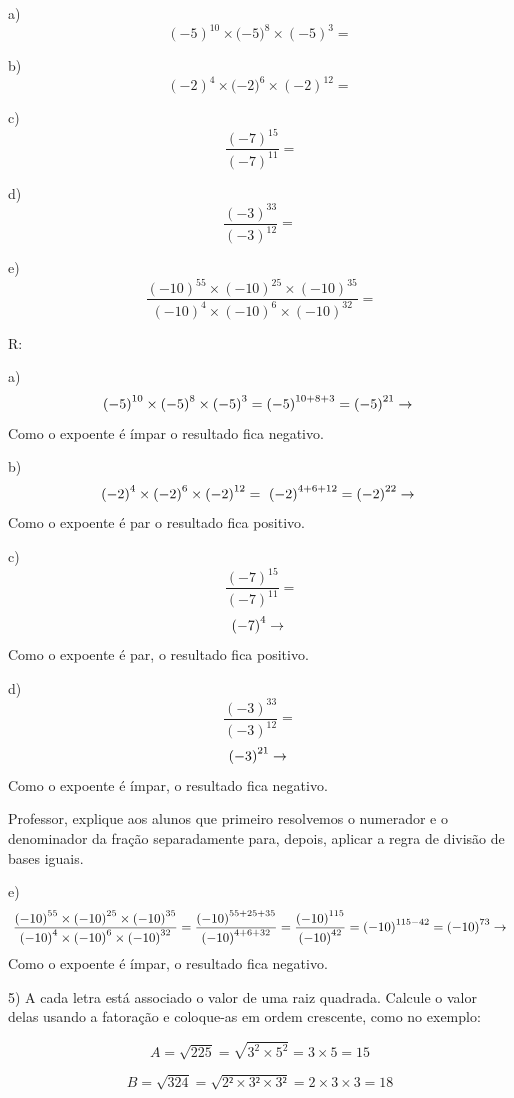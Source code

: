 a) \[{( - 5)}^{10} \times ( - {5)}^{8} \times {( - 5)}^{3} =\]

b) \[{( - 2)}^{4} \times ( - {2)}^{6} \times {( - 2)}^{12} =\]

c) \[\ \frac{{( - 7)}^{15}}{{( - 7)}^{11}} =\]

d) \[\frac{{( - 3)}^{33}}{{( - 3)}^{12}} =\]

e)\[\ \frac{{( - 10)}^{55} \times {( - 10)}^{25} \times {( - 10)}^{35}}{{( - 10)}^{4} \times {( - 10)}^{6} \times {( - 10)}^{32}} =\]

R:

a)
\[{( - 5)}^{10} \times ( - {5)}^{8} \times \left( - 5 \right)^{3} = \left( - 5 \right)^{10 + 8 + 3} = \left( - 5 \right)^{21} \rightarrow\\\]
Como o expoente é ímpar o resultado fica negativo.

b)
\[{( - 2)}^{4} \times ( - {2)}^{6} \times \left( - 2 \right)^{12} = \ \left( - 2 \right)^{4 + 6 + 12} = \left( - 2 \right)^{22} \rightarrow \\\]
Como o expoente é par o resultado fica positivo.

c) \[\ \frac{{( - 7)}^{15}}{{( - 7)}^{11}} =\]
\[{( - 7)}^{4} \rightarrow \\\] Como o expoente é par, o resultado fica
positivo.

d) \[\frac{{( - 3)}^{33}}{{( - 3)}^{12}} =\]
\[{( - 3)}^{21} \rightarrow \\\] Como o expoente é ímpar, o resultado
fica negativo.

Professor, explique aos alunos que primeiro resolvemos o numerador e o
denominador da fração separadamente para, depois, aplicar a regra de
divisão de bases iguais.

e)\[\ \frac{{( - 10)}^{55} \times {( - 10)}^{25} \times {( - 10)}^{35}}{{( - 10)}^{4} \times {( - 10)}^{6} \times {( - 10)}^{32}} = \frac{{( - 10)}^{55 + 25 + 35}}{{( - 10)}^{4 + 6 + 32}} = \frac{{( - 10)}^{115}}{{( - 10)}^{42}} = {( - 10)}^{115 - 42} = {( - 10)}^{73} \rightarrow\\\]
Como o expoente é ímpar, o resultado fica negativo.

5) A cada letra está associado o valor de uma raiz quadrada. Calcule o
valor delas usando a fatoração e coloque-as em ordem crescente, como no
exemplo:

\[A = \sqrt{225} = \sqrt{3^{2} \times 5^{2}} = 3 \times 5 = 15\]

\[B = \sqrt{324} = \sqrt{2² \times 3² \times 3²} = 2 \times 3 \times 3 = 18\]

